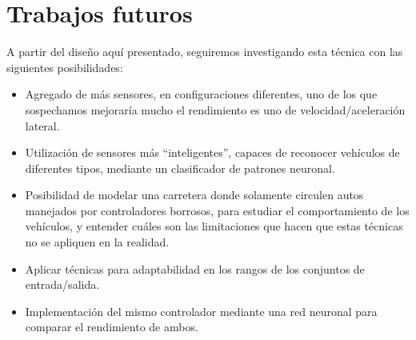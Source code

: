 \documentclass[conference,spanish,a4paper,10pt,oneside,final]{tfmpd}
\begin{document}
\section{Trabajos futuros}
A partir del diseño aquí presentado, seguiremos investigando esta técnica con las siguientes
posibilidades:
\begin{itemize}
\item Agregado de más sensores, en configuraciones diferentes, uno de los que sospechamos
      mejoraría mucho el rendimiento es uno de velocidad/aceleración lateral.
\item Utilización de sensores más ``inteligentes'', capaces de reconocer vehículos de
      diferentes tipos, mediante un clasificador de patrones neuronal.
\item Posibilidad de modelar una carretera donde solamente circulen autos manejados por
      controladores borrosos, para estudiar el comportamiento de los vehículos,
      y entender cuáles son las limitaciones que hacen que estas técnicas no se apliquen en
      la realidad.
\item Aplicar técnicas para adaptabilidad en los rangos de los conjuntos de entrada/salida. 
\item Implementación del mismo controlador mediante una red neuronal para comparar el rendimiento
      de ambos.
\end{itemize}

\nocite{*}


\end{document}
